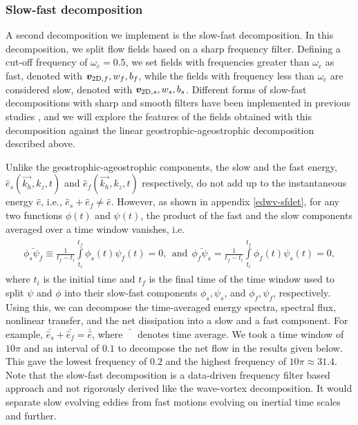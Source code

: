 \documentclass[../Rajarshi-thesis-draft.tex]{subfiles}
\begin{document}

\subsubsection{Slow-fast decomposition}    \label{edwv-sfdcmp}
A second decomposition we implement is the slow-fast decomposition. In this decomposition, we split flow fields based on a sharp frequency filter. Defining a cut-off frequency of $\omega_c = 0.5$, we set fields with frequencies greater than $\omega_c$ as fast, denoted with $\vec{v}_{{\rm 2D},f},w_f, b_f$, while the fields with frequency less than $\omega_c$ are considered slow, denoted with $\vec{v}_{{\rm 2D},s},w_s,b_s$. Different forms of slow-fast decompositions with sharp and smooth filters have been implemented in previous studies  \citep{BWM17, Taylor_Straub_2020, Arbic_2022, delpech_etal_2024}, and we will explore the features of the fields obtained with this decomposition against the linear geostrophic-ageostrophic decomposition described above.


Unlike the geostrophic-ageostrophic components, the slow and the fast energy, $\hat{e}_s (\vec{k_h},k_z,t)$ and $\hat{e}_f (\vec{k_h},k_z,t)$ respectively, do not add up to the instantaneous energy $\hat{e}$, i.e., $\hat{e}_s + \hat{e}_f \neq \hat{e}$. However, as shown in appendix \ref{edwv-sfdet}, for any two functions $\phi(t)$ and $\psi(t)$, the product of the fast and the slow components averaged over a time window vanishes, i.e. %
\begin{align}
    \begin{split}
        \bar{\phi_s\psi_f } \equiv \frac1{t_f - t_i}\int\limits_{t_i}^{t_f} \phi_s(t)\psi_f(t)=0, \ \ \mbox{and}\ \ 
        \bar{ \phi_f \psi_s } =  \frac1{t_f - t_i}\int\limits_{t_i}^{t_f} \phi_f(t)\psi_s(t) = 0 ,
    \end{split}
\end{align}
where $t_i$ is the initial time and $t_f$ is the final time of the time window used to split $\psi$ and $\phi$ into their slow-fast components $\phi_s,\psi_s$, and $\phi_f,\psi_f$, respectively. Using this, we can decompose the time-averaged energy spectra, spectral flux, nonlinear transfer, and the net dissipation into a slow and a fast component. For example, $\bar{\hat{e}_s} + \bar{\hat{e}_f} = \bar{\hat{e} } $, where $\bar{\phantom{\hat{e}_f}}$ denotes time average. We took a time window of $10\pi$ and an interval of $0.1$ to decompose the net flow in the results given below. This gave the lowest frequency of $0.2$ and the highest frequency of $10\pi \approx 31.4$. Note that the slow-fast decomposition is a data-driven frequency filter based approach and not rigorously derived like the wave-vortex decomposition. It would separate slow evolving eddies from fast motions evolving on inertial time scales and further. %
\end{document}
